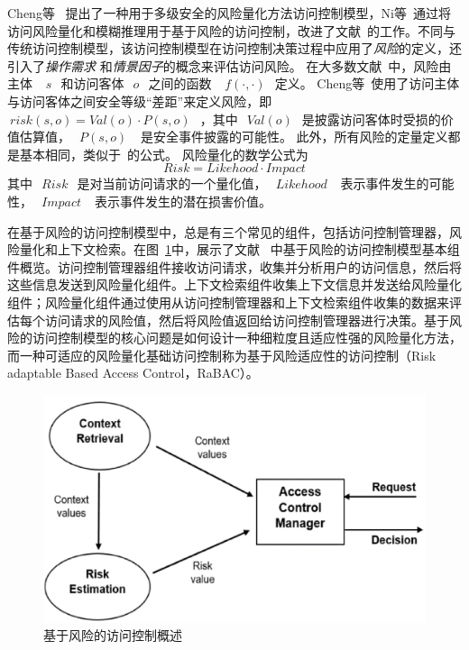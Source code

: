 Cheng等~\cite{cheng2007fuzzy} 提出了一种用于多级安全的风险量化方法访问控制模型，Ni等~\cite{ni2010risk}通过将访问风险量化和模糊推理用于基于风险的访问控制，改进了文献~\cite{cheng2007fuzzy}的工作。不同与传统访问控制模型，该访问控制模型在访问控制决策过程中应用了\emph{风险}的定义，还引入了\emph{操作需求} 和\emph{情景因子}的概念来评估访问风险。 在大多数文献~\cite{cheng2007fuzzy,ni2010risk,kandala2011attribute,bijon2012risk}中，风险由主体 ~$~s~$~和访问客体~$~o~$~之间的函数 ~$~f(\cdot, \cdot)~$~定义。 Cheng等~\cite{cheng2007fuzzy}使用了访问主体与访问客体之间安全等级“差距”来定义风险，即~$~risk(s,o)=Val(o) \cdot P(s,o)~$~，其中~$~Val(o)~$~是披露访问客体时受损的价值估算值，~$~P(s,o)~$~ 是安全事件披露的可能性。 此外，所有风险的定量定义都是基本相同，类似于~\cite{cheng2007fuzzy}的公式。 风险量化的数学公式为
\begin{equation}\label{eq:naive_risk}
Risk = Likehood \cdot Impact
\end{equation}
其中~$~Risk~$~是对当前访问请求的一个量化值，~$~Likehood~$~ 表示事件发生的可能性，~$~Impact~$~ 表示事件发生的潜在损害价值。


在基于风险的访问控制模型中，总是有三个常见的组件，包括访问控制管理器，风险量化和上下文检索。在图~\ref{fig:rbac}中，展示了文献 ~\cite{diep2007enforcing}中基于风险的访问控制模型基本组件概览。访问控制管理器组件接收访问请求，收集并分析用户的访问信息，然后将这些信息发送到风险量化组件。上下文检索组件收集上下文信息并发送给风险量化组件；风险量化组件通过使用从访问控制管理器和上下文检索组件收集的数据来评估每个访问请求的风险值，然后将风险值返回给访问控制管理器进行决策。基于风险的访问控制模型的核心问题是如何设计一种细粒度且适应性强的风险量化方法，而一种可适应的风险量化基础访问控制称为基于风险适应性的访问控制（Risk adaptable Based Access Control，RaBAC）。

\begin{figure}[htb]
	\centering
	\includegraphics[width=.6\textwidth]{./figures/fig-rbac.jpg}
	\caption{基于风险的访问控制概述~\cite{diep2007enforcing}}\label{fig:rbac}
\end{figure}

